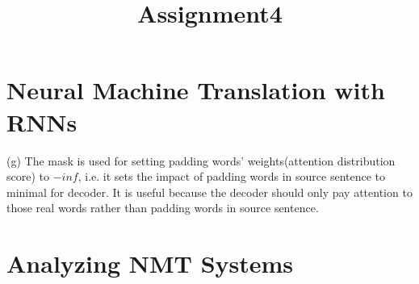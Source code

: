 \documentclass[11pt]{article}
\title{Assignment4}
\begin{document}
\maketitle
\section{Neural Machine Translation with RNNs}
(g) The mask is used for setting padding words' weights(attention distribution score) to $-inf$, i.e. it sets the impact of padding words in source sentence to minimal for decoder. It is useful because the decoder should only pay attention to those real words rather than padding words in source sentence.
\section{Analyzing NMT Systems}
\end{document}

